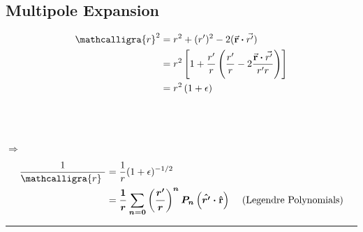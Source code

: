 \documentclass[12pt]{article}
\newcommand*{\bfr}{\mathbf{r}}
\newcommand{\scripty}[1]{\ensuremath{\mathcalligra{#1}}}
\newcommand*{\cursr}{\scripty{r}}		%
\newcommand*{\cursrr}{\scripty{r}\ }
\newcommand*{\dotP}{\boldsymbol \cdot}		%
\begin{document}
%
%
\newpage
\subsection{Multipole Expansion}
\begin{center}
\begin{minipage}[t]{0.3\textwidth}
	\begin{align*}
		\cursr^2 &= r^2 + (r')^2 - 2( \vec{\bfr} \dotP \vec{r'} ) \\
		&= r^2 \left [ 1 + \frac{r'}{r} \left ( \frac{ r' }{r} - 2\frac{ \vec{\bfr} \dotP \vec{r'} }{r'r} \right ) \right ] \\
		&= r^2 \left ( 1 + \epsilon \right )
	\end{align*}
\end{minipage}
\hspace{0\textwidth}
\begin{minipage}[t]{0.01\textwidth}
	\hfill \break \\ \\ \\
	\( \Rightarrow \)
\end{minipage}
\hspace{0\textwidth}
\begin{minipage}[t]{0.3\textwidth}
	\begin{align*}
		\frac{1}{\cursrr} &= \frac{1}{r} ( 1 + \epsilon )^{-1/2} \\
		&= \boldsymbol{ \frac{1}{r} \sum_{n=0} \left ( \frac{r'}{r} \right )^n 
			P_n \left ( \hat{r'} \dotP \hat{\bfr} \right ) }\ \ \ \ \text{(Legendre Polynomials)}
	\end{align*}	
\end{minipage}
\end{center}
\rule{0.75\paperwidth}{0.1pt}
\end{document}
